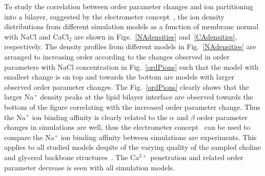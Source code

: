 \documentclass[pre,aps,floatfix,authordate1-4,twocolumn]{revtex4-1}
\begin{document}
To study the correlation between order parameter changes and ion partitioning into a bilayer, 
suggested by the electrometer concept~\cite{akutsu81,altenbach84,seelig87,scherer89}, the ion 
density distributions from different simulation models as a function of membrane normal with NaCl and CaCl$_2$ are shown in 
Figs.~\ref{NAdensities} and~\ref{CAdensities}, respectively. The density profiles from different models in Fig.~\ref{NAdensities}
are arranged to increasing order according to the changes observed in order parameters with NaCl concentration in Fig.~\ref{ordPions}
such that the model with smallest change is on top and towards the bottom are models with larger observed order parameter changes.
The Fig.~\ref{ordPions} clearly shows that the larger Na$^+$ density peaks at the lipid bilayer interface are
observed towards the bottom of the figure correlating with the increased order parameter change. 
Thus the Na$^+$ ion binding affinity is clearly related to the $\alpha$ and $\beta$ order parameter
changes in simulations are well, thus the electrometer concept~\cite{akutsu81,altenbach84,seelig87,scherer89}
can be used to compare the Na$^+$ ion binding affinity between simulations are experiments.
This applies to all studied models despite of the varying quality of the sampled choline and glycerol backbone structures~\cite{botan15}.
The Ca$^{2+}$ penetration and related order parameter decrease is seen with all simulation models.
\end{document}
